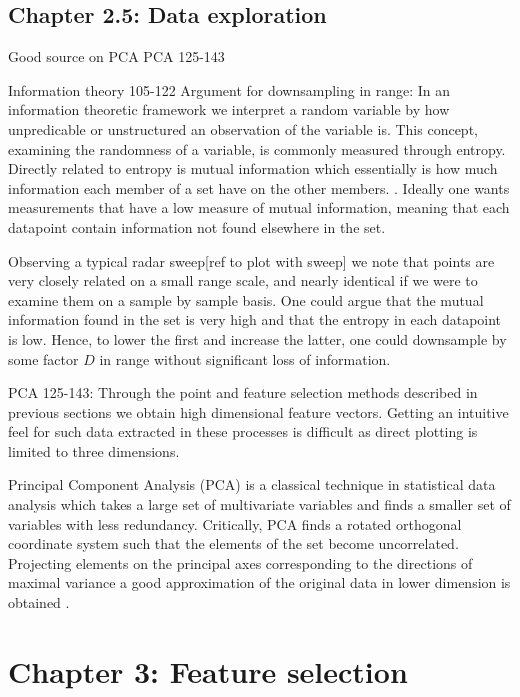 \documentclass[a4paper, 12pt]{article}
\begin{document}
\subsection{Chapter 2.5: Data exploration}

Good source on PCA
\cite{hyvasrinen_karhunen_oja_2004}
PCA 125-143

Information theory
105-122
Argument for downsampling in range: In an information theoretic framework we interpret a random variable by how unpredicable or unstructured an observation of the variable is. This concept, examining the randomness of a variable, is commonly measured through entropy. Directly related to entropy is mutual information which essentially is how much information each member of a set have on the other members. \cite{hyvasrinen_karhunen_oja_2004}. Ideally one wants measurements that have a low measure of mutual information, meaning that each datapoint contain information not found elsewhere in the set. 

Observing a typical radar sweep[ref to plot with sweep] we note that points are very closely related on a small range scale, and nearly identical if we were to examine them on a sample by sample basis. One could argue that the mutual information found in the set is very high and that the entropy in each datapoint is low. Hence, to lower the first and increase the latter, one could downsample by some factor $D$ in range without significant loss of information.


PCA 125-143: Through the point and feature selection methods described in previous sections we obtain high dimensional feature vectors. Getting an intuitive feel for such data extracted in these processes is difficult as direct plotting is limited to three dimensions. 

Principal Component Analysis (PCA) is  a classical technique in statistical data analysis which takes a large set of multivariate variables and finds a smaller set of variables with less redundancy. Critically, PCA finds a rotated orthogonal coordinate system such that the elements of the set become uncorrelated. Projecting elements on the principal axes corresponding to the directions of maximal variance a good approximation of the original data in lower dimension is obtained \citep{hyvasrinen_karhunen_oja_2004}. 

\section{Chapter 3: Feature selection}
\end{document}
